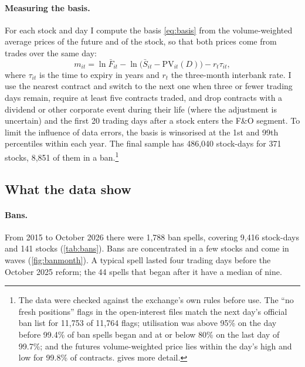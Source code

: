 \paragraph{Measuring the basis.} For each stock and day I compute the basis \eqref{eq:basis} from the volume-weighted
average prices of the future and of the stock, so that both prices come from trades over the same day:
\begin{equation}\label{eq:basis-data}
m_{it}=\ln\bar F_{it}-\ln\!\big(\bar S_{it}-\mathrm{PV}_{it}(D)\big)-r_t\tau_{it},
\end{equation}
where $\tau_{it}$ is the time to expiry in years and $r_t$ the three-month interbank rate. I use the nearest contract
and switch to the next one when three or fewer trading days remain, require at least five contracts traded, and drop
contracts with a dividend or other corporate event during their life (where the adjustment is uncertain) and the first
20 trading days after a stock enters the F\&O segment. To limit the influence of data errors, the basis is winsorised at
the 1st and 99th percentiles within each year. The final sample has 486,040 stock-days for 371 stocks, 8,851 of them
in a ban.\footnote{The data were checked against the exchange's own rules before use. The ``no fresh positions'' flags
in the open-interest files match the next day's official ban list for 11,753 of 11,764 flags; utilisation was above
95\% on the day before 99.4\% of ban spells began and at or below 80\% on the last day of 99.7\%; and the futures
volume-weighted price lies within the day's high and low for 99.8\% of contracts.  gives more detail.}

\subsection{What the data show}
\paragraph{Bans.} From 2015 to October 2026 there were 1,788 ban spells, covering 9,416 stock-days and 141 stocks
(\cref{tab:bans}). Bans are concentrated in a few stocks and come in waves (\cref{fig:banmonth}). A typical spell lasted
four trading days before the October 2025 reform; the 44 spells that began after it have a median of nine.

\begin{table}[t]
\caption{Bans are frequent, concentrated in a few stocks, and longer under the new rule}\label{tab:bans}
\centering{\footnotesize\setlength{\tabcolsep}{4pt}}
\end{table}

